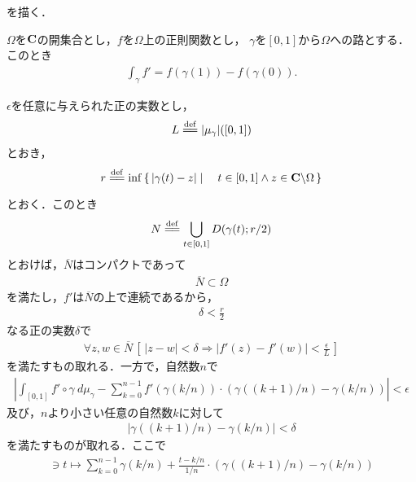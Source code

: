 	を描く．
	
	\begin{screen}
		\begin{thm}[線積分の微分積分学の基本定理]
			$\Omega$を$\mathbf{C}$の開集合とし，$f$を$\Omega$上の正則関数とし，
			$\gamma$を$[0,1]$から$\Omega$への路とする．このとき
			\begin{align}
				\int_{\gamma} f' = f(\gamma(1)) - f(\gamma(0)).
			\end{align}
		\end{thm}
	\end{screen}
	
	\begin{sketch}
		$\epsilon$を任意に与えられた正の実数とし，
		\begin{align}
			L \defeq |\mu_{\gamma}|([0,1])
		\end{align}
		とおき，
		\begin{align}
			r \defeq \inf{}{\Set{|\gamma(t) - z|}{t \in [0,1] \wedge z \in \C \backslash \Omega}}
		\end{align}
		とおく．このとき
		\begin{align}
			N \defeq \bigcup_{t \in [0,1]} \disc{\gamma(t)}{r/2}
		\end{align}
		とおけば，$\overline{N}$はコンパクトであって
		\begin{align}
			\overline{N} \subset \Omega
		\end{align}
		を満たし，$f'$は$\overline{N}$の上で連続であるから，
		\begin{align}
			\delta < \frac{r}{2}
		\end{align}
		なる正の実数$\delta$で
		\begin{align}
			\forall z,w \in \overline{N}\,
			\left[\, |z-w| < \delta \Longrightarrow |f'(z) - f'(w)| < \frac{\epsilon}{L}\, \right]
		\end{align}
		を満たすもの取れる．一方で，自然数$n$で
		\begin{align}
			\left|\int_{[0,1]} f' \circ \gamma\ d\mu_{\gamma}
			- \sum_{k=0}^{n-1} f'(\gamma(k/n)) \cdot \left(\gamma((k+1)/n) - \gamma(k/n)\right)\right|
			< \epsilon
		\end{align}
		及び，$n$より小さい任意の自然数$k$に対して
		\begin{align}
			|\gamma((k+1)/n) - \gamma(k/n)| < \delta
		\end{align}
		を満たすものが取れる．ここで
		\begin{align}
			[0,1] \ni t \longmapsto \sum_{k=0}^{n-1} \gamma(k/n) + \frac{t - k/n}{1/n} \cdot \left(\gamma((k+1)/n) - \gamma(k/n)\right)

\end{align}
\end{sketch}
